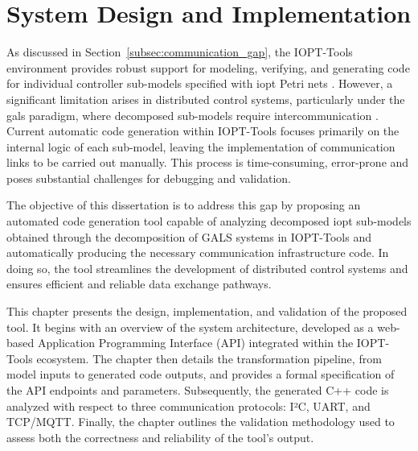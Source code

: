 
%

\chapter{System Design and Implementation}
\label{cha:chap_3}


As discussed in Section~\ref{subsec:communication_gap}, the IOPT-Tools environment provides robust support for modeling, verifying, and generating code for individual controller sub-models specified with \gls{iopt} Petri nets \cite{iopttools, barros2004, RefiningIOPT}. However, a significant limitation arises in distributed control systems, particularly under the \gls{gals} paradigm, where decomposed sub-models require intercommunication \cite{galsactd, Barrosadd}. Current automatic code generation within IOPT-Tools focuses primarily on the internal logic of each sub-model, leaving the implementation of communication links to be carried out manually. This process is time-consuming, error-prone and poses substantial challenges for debugging and validation.  

The objective of this dissertation is to address this gap by proposing an automated code generation tool capable of analyzing decomposed \gls{iopt} sub-models obtained through the decomposition of GALS systems in IOPT-Tools and automatically producing the necessary communication infrastructure code. In doing so, the tool streamlines the development of distributed control systems and ensures efficient and reliable data exchange pathways.  

This chapter presents the design, implementation, and validation of the proposed tool. It begins with an overview of the system architecture, developed as a web-based Application Programming Interface (API) integrated within the IOPT-Tools ecosystem. The chapter then details the transformation pipeline, from model inputs to generated code outputs, and provides a formal specification of the API endpoints and parameters. Subsequently, the generated C++ code is analyzed with respect to three communication protocols: I²C, UART, and TCP/MQTT. Finally, the chapter outlines the validation methodology used to assess both the correctness and reliability of the tool’s output.  


